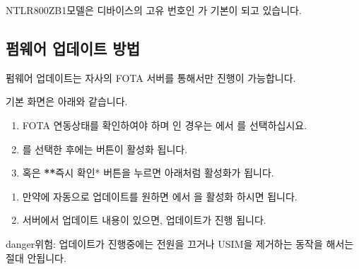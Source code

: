 \documentclass[letterpaper,10pt,english]{sphinxmanual}
\begin{document}
\noindent{}

\sphinxAtStartPar
NTLR800Z\sphinxhyphen{}B1모델은 디바이스의 고유 번호인  가 기본이 되고 있습니다.


\subsection{펌웨어 업데이트 방법}
\label{\detokenize{howto/device_manage:id3}}
\sphinxAtStartPar
펌웨어 업데이트는 자사의 FOTA 서버를 통해서만 진행이 가능합니다.

\sphinxAtStartPar
기본 화면은 아래와 같습니다.

\noindent{}
\begin{enumerate}
%
\item {} 
\sphinxAtStartPar
FOTA 연동상태를 확인하여야 하며  인 경우는  에서  를 선택하십시요.

\item {} 
\sphinxAtStartPar
{} 를 선택한 후에는  버튼이 활성화 됩니다.

\item {} 
\sphinxAtStartPar
{} 혹은 {\color{red}\bfseries{}**}즉시 확인* 버튼을 누르면 아래처럼 활성화가 됩니다.

\end{enumerate}

\noindent{}
\begin{enumerate}
%
\setcounter{enumi}{3}
\item {} 
\sphinxAtStartPar
만약에 자동으로 업데이트를 원하면  에서  을 활성화 하시면 됩니다.

\item {} 
\sphinxAtStartPar
서버에서 업데이트 내용이 있으면, 업데이트가 진행 됩니다.

\end{enumerate}

\begin{sphinxadmonition}{danger}{위험:}
\sphinxAtStartPar
업데이트가 진행중에는 전원을 끄거나 USIM을 제거하는 동작을 해서는 절대 안됩니다.
\end{sphinxadmonition}
\end{document}
